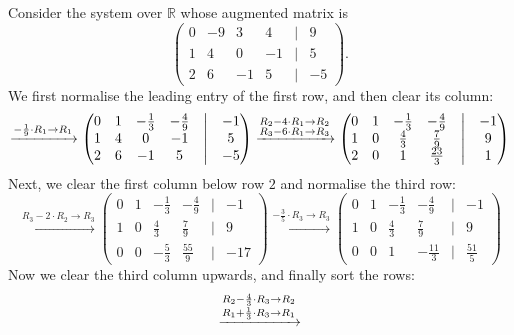 \begin{example}
\label{ex:full_reduction}
Consider the system over $\mathbb{R}$ whose augmented matrix is
\[
\begin{pmatrix}
0 & -9 & 3 & 4 & \big| & 9 \\
1 & 4 & 0 & -1 & \big| & 5 \\
2 & 6 & -1 & 5 & \big| & -5
\end{pmatrix}.
\]
We first normalise the leading entry of the first row, and then clear its column:
\[
\xrightarrow{-\frac{1}{9} \cdot R_1 \to R_1}
\begin{pmatrix}
0 & 1 & -\frac{1}{3} & -\frac{4}{9} & \big| & -1 \\
1 & 4 & 0 & -1 & \big| & 5 \\
2 & 6 & -1 & 5 & \big| & -5
\end{pmatrix}
\xrightarrow{\begin{subarray}{l} R_2 - 4 \cdot R_1 \to R_2 \\ R_3 - 6 \cdot R_1 \to R_3 \end{subarray}}
\begin{pmatrix}
0 & 1 & -\frac{1}{3} & -\frac{4}{9} & \big| & -1 \\
1 & 0 & \frac{4}{3} & \frac{7}{9} & \big| & 9 \\
2 & 0 & 1 & \frac{23}{3} & \big| & 1
\end{pmatrix}
\]
Next, we clear the first column below row $2$ and normalise the third row:
\[
\xrightarrow{R_3 - 2 \cdot R_2 \to R_3}
\begin{pmatrix}
0 & 1 & -\frac{1}{3} & -\frac{4}{9} & \big| & -1 \\
1 & 0 & \frac{4}{3} & \frac{7}{9} & \big| & 9 \\
0 & 0 & -\frac{5}{3} & \frac{55}{9} & \big| & -17
\end{pmatrix}
\xrightarrow{-\frac{3}{5} \cdot R_3 \to R_3}
\begin{pmatrix}
0 & 1 & -\frac{1}{3} & -\frac{4}{9} & \big| & -1 \\
1 & 0 & \frac{4}{3} & \frac{7}{9} & \big| & 9 \\
0 & 0 & 1 & -\frac{11}{3} & \big| & \frac{51}{5}
\end{pmatrix}
\]
Now we clear the third column upwards, and finally sort the rows:
\[
\xrightarrow{\begin{subarray}{l} R_2 - \frac{4}{3} \cdot R_3 \to R_2 \\R_1 + \frac{1}{3} \cdot R_3 \to R_1 \end{subarray}}
\]
\end{example}
